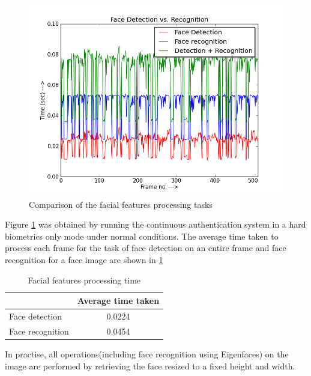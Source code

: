 \documentclass[%
        final,
        internal,
        notitlepage,
        narroweqnarray,
        inline,
        ]{ieee}
\begin{document}
\begin{figure}[h!]
	\centering
	\includegraphics[scale=0.40]{img/fd_fr_fdfr.png}
	\caption{Comparison of the facial features processing tasks}
	\label{fig:fdfr}
\end{figure}
Figure \ref{fig:fdfr} was obtained by running the continuous authentication system in a hard biometrics only mode under normal conditions. The average time taken to process each frame for the task of face detection on an entire frame and face recognition for a face image are shown in \ref{tab:fdr}

\begin{table}[htp]
	\centering
	\caption{Facial features processing time}
	\begin{tabular}{||l|c||} \hline \hline
			    &  Average time taken \\ \hline
	Face detection      &  0.0224             \\ \hline
	Face recognition    &  0.0454             \\ \hline \hline
	\end{tabular}
	\label{tab:fdr}
\end{table}
In practise, all operations(including face recognition using Eigenfaces) on the image are performed by retrieving the face resized to a fixed height and width.
\end{document}

